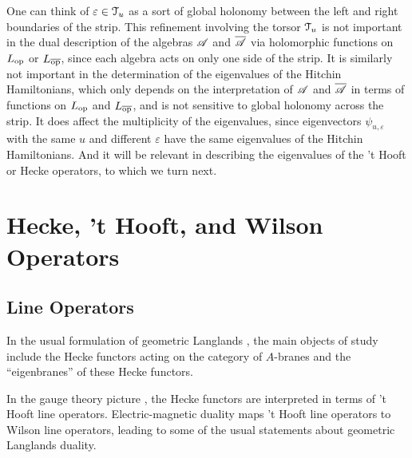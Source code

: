 \documentclass[11pt,a4paper]{article}
\begin{document}
One can think of $\varepsilon\in{\mathcal T}_u$ as a sort of global holonomy between the left and right boundaries of the strip.
This refinement involving the torsor ${\mathcal T}_u$ is not important in the dual description of
the algebras ${\mathscr A}$ and $\overline{\mathscr A}$ via holomorphic functions on $L_{\mathrm{op}}$ or $L_{\overline{\mathrm{op}}}$, since each algebra acts on only one side of the strip.
   It is similarly not important in the determination of the eigenvalues of the Hitchin
Hamiltonians, which only depends on the interpretation of ${\mathscr A}$ and $\overline{\mathscr A}$ in terms of functions on $L_{\mathrm{op}}$ and $L_{\overline{\mathrm{op}}}$, and is not sensitive
to global holonomy across the strip.    It does affect the multiplicity of the eigenvalues, 
since eigenvectors $\psi_{u,\varepsilon}$ with the same $u$
and different $\varepsilon$ have the same eigenvalues of the Hitchin Hamiltonians.   And it will be relevant
in describing the eigenvalues of the 't Hooft or Hecke operators, to which we turn next.


 









\section{Hecke, 't Hooft, and Wilson Operators}\label{wtw}

\subsection{Line Operators}

In the usual formulation of geometric Langlands \cite{BD}, the main objects of study include the  Hecke functors acting on the category of $A$-branes and
the ``eigenbranes'' of these Hecke functors.

In the gauge theory picture \cite{KW}, the Hecke functors are interpreted in terms of 't Hooft line operators.   Electric-magnetic duality maps 't Hooft
line operators to Wilson line operators, leading to some of the usual statements about geometric Langlands duality.
\end{document}

